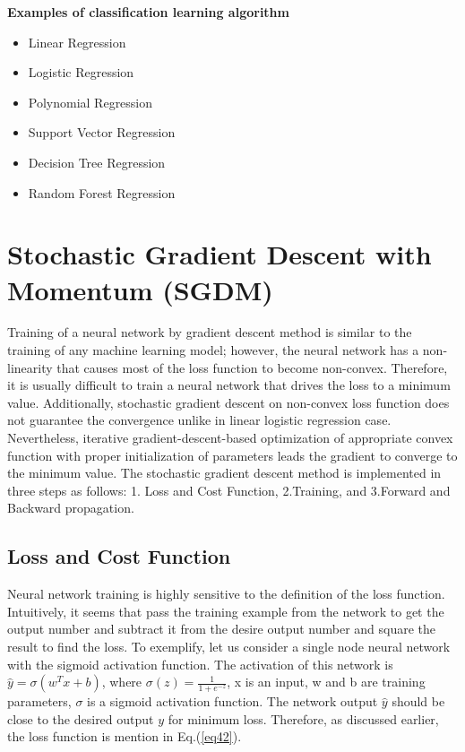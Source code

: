 \textbf{Examples of classification learning algorithm}
\begin{itemize}
    \item Linear Regression
    \item Logistic Regression
    \item Polynomial Regression
    \item Support Vector Regression
    \item Decision Tree Regression
    \item Random Forest Regression
\end{itemize}

\section{Stochastic Gradient Descent with Momentum (SGDM)}
Training of a neural network by gradient descent method is similar to the training of any machine learning model; however, the neural network has a non-linearity that causes most of the loss function to become non-convex. Therefore, it is usually difficult to train a neural network that drives the loss to a minimum value. Additionally, stochastic gradient descent on non-convex loss function does not guarantee the convergence unlike in linear logistic regression case. Nevertheless, iterative gradient-descent-based optimization of appropriate convex function with proper initialization of parameters leads the gradient to converge to the minimum value. The stochastic gradient descent method is implemented in three steps as follows: 1. Loss and Cost Function, 2.Training, and 3.Forward and Backward propagation.

\subsection{Loss and Cost Function}
Neural network training is highly sensitive to the definition of the loss function. Intuitively, it seems that pass the training example from the network to get the output number and subtract it from the desire output number and square the result to find the loss. To exemplify, let us consider a single node neural network with the sigmoid activation function. The activation of this network is $ \hat{y}= \sigma \left(w^{T} x+b\right)$, where $\sigma(z)=\frac{1}{1+e^{-z}}$, x is an input, w and b are training parameters, $\sigma$ is a sigmoid activation function. The network output $\hat{y}$ should be close to the desired output $y$ for minimum loss. Therefore, as discussed earlier, the loss function is mention in Eq.(\ref{eq42}).

